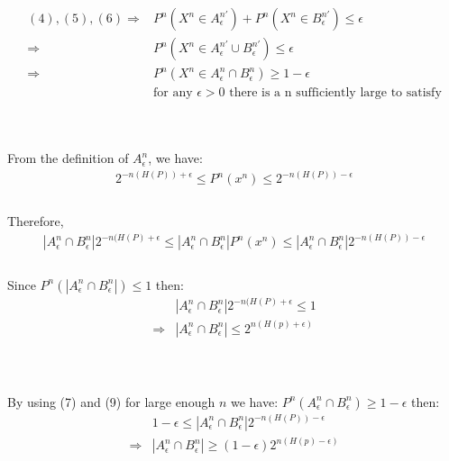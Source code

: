 \documentclass[
  course = {{EE623 Information Theory}},
  quartile = {{3}},
  assignment = 3,
  name = {{Mohammad Mahdi Rahimi}},
  studentnumber = {{20208244}},
  email = {{mahi@kaist.ac.kr}},
  firstexercise = 1
]{aga-homework}
\begin{document}
\begin{equation}
    \begin{split}
        (4), (5), (6) \Rightarrow & P^n(X^n \in A^{n\prime}_\epsilon) + P^n(X^n \in  B^{n\prime}_\epsilon) \le \epsilon\\
        \Rightarrow & P^n(X^n \in A^{n\prime}_\epsilon \cup B^{n\prime}_\epsilon) \le \epsilon\\
        \Rightarrow & P^n(X^n \in A^n_\epsilon \cap B^n_\epsilon) \ge 1 - \epsilon\\
        &\text{for any } \epsilon > 0 \text{ there is a n sufficiently large to satisfy}
    \end{split}
\end{equation}

\subexercise
\\\\

From the definition of $A^n_\epsilon$, we have:\\
\begin{equation}
    \begin{split}
        2^{-n(H(P)) + \epsilon} \le P^n(x^n) \le 2^{-n(H(P))-\epsilon}\\
    \end{split}
\end{equation}\\
Therefore,\\
\begin{equation}
    \begin{split}
        |A^n_\epsilon \cap B^n_\epsilon|2^{-n(H(P) + \epsilon} \le |A^n_\epsilon \cap B^n_\epsilon|P^n(x^n) \le |A^n_\epsilon \cap B^n_\epsilon|2^{-n(H(P))-\epsilon}\\
    \end{split}
\end{equation}\\
Since $P^n(|A^n_\epsilon \cap B^n_\epsilon|) \le 1$ then:
\begin{equation}
    \begin{split}
        &|A^n_\epsilon \cap B^n_\epsilon|2^{-n(H(P) + \epsilon} \le 1\\
        \Rightarrow & |A^n_\epsilon \cap B^n_\epsilon| \le 2^{n(H(p) + \epsilon)}
    \end{split}
\end{equation}\\

\subexercise
\\\\
By using (7) and (9) for large enough $n$ we have: $P^n(A^n_\epsilon \cap B^n_\epsilon) \ge 1 - \epsilon$ then:
\begin{equation}
    \begin{split}
        & 1 - \epsilon \le |A^n_\epsilon \cap B^n_\epsilon|2^{-n(H(P))-\epsilon}\\
        \Rightarrow & |A^n_\epsilon \cap B^n_\epsilon| \ge (1 - \epsilon)2^{n(H(p) - \epsilon)}
    \end{split}
\end{equation}\\
\end{document}
